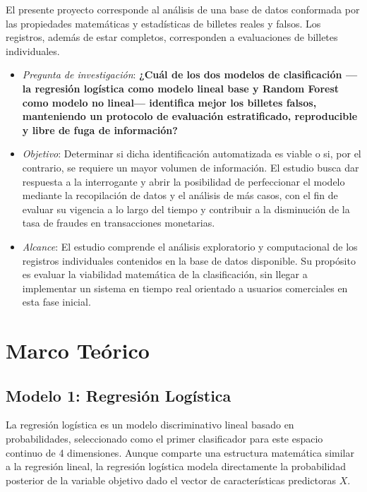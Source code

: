 \documentclass[conference]{IEEEtran}
\begin{document}
	El presente proyecto corresponde al análisis de una base de datos conformada por las propiedades matemáticas y estadísticas de billetes reales y falsos. Los registros, además de estar completos, corresponden a evaluaciones de billetes individuales.\\
	
	\begin{itemize}
		\item \textit{Pregunta de investigación}: \textbf{¿Cuál de los dos modelos de clasificación —la regresión logística como modelo lineal base y Random Forest como modelo no lineal— identifica mejor los billetes falsos, manteniendo un protocolo de evaluación estratificado, reproducible y libre de fuga de información?}\\
		\item \textit{Objetivo}: Determinar si dicha identificación automatizada es viable o si, por el contrario, se requiere un mayor volumen de información. El estudio busca dar respuesta a la interrogante y abrir la posibilidad de perfeccionar el modelo mediante la recopilación de datos y el análisis de más casos, con el fin de evaluar su vigencia a lo largo del tiempo y contribuir a la disminución de la tasa de fraudes en transacciones monetarias.\\
		\item\textit{ Alcance}: El estudio comprende el análisis exploratorio y computacional de los registros individuales contenidos en la base de datos disponible. Su propósito es evaluar la viabilidad matemática de la clasificación, sin llegar a implementar un sistema en tiempo real orientado a usuarios comerciales en esta fase inicial.
	\end{itemize}
	
	
	
	\section{Marco Teórico}
	\subsection{Modelo 1: Regresión Logística}
	
	La regresión logística es un modelo discriminativo lineal basado en probabilidades, seleccionado como el primer clasificador para este espacio continuo de 4 dimensiones\cite{aws_logistic_regression}. Aunque comparte una estructura matemática similar a la regresión lineal, la regresión logística modela directamente la probabilidad posterior de la variable objetivo dado el vector de características predictoras $X$.
	
\end{document}
